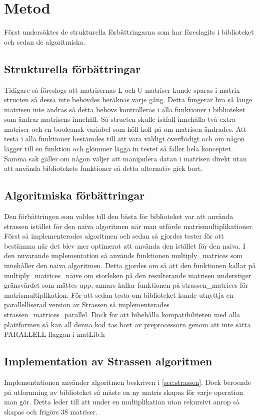 \section{Metod}
Först undersöktes de strukturella förbättringarna som har föreslagits i biblioteket och sedan de algoritmiska.
\subsection{Strukturella förbättringar}
Tidigare så föreslogs att matrisernas L och U matriser kunde sparas i matrix-structen så dessa inte behövdes beräknas varje gång. Detta fungerar bra så länge matrisen inte ändras så detta behövs kontrolleras i alla funktioner i biblioteket som ändrar matrisens innehåll. Så structen skulle isåfall innehålla två extra matriser och en booleansk variabel som höll koll på om matrisen ändrades. Att testa i alla funktioner bestämdes till att vara väldigt överflödigt och om någon lägger till en funktion och glömmer lägga in testet så faller hela konceptet. Samma sak gäller om någon väljer att manipulera datan i matrisen direkt utan att använda bibliotekets funktioner så detta alternativ gick bort.

\subsection{Algoritmiska förbättringar}
Den förbättringen som valdes till den bästa för biblioteket var att använda strassen istället för den naiva algoritmen när man utförde matrismultiplikationer. Först så implementerades algoritmen och sedan så gjordes tester för att bestämma när det blev mer optimerat att använda den istället för den naiva. I den nuvarande implementation så används funktionen multiply\_matrices som innehåller den naiva algoritmen. Detta gjordes om så att den funktionen kallar på multiply\_matrices\_naive om storleken på den resulterande matrisen understiger gränsvärdet som mättes upp, annars kallar funktionen på strassen\_matrices för matrismultiplikation. 
\newline
\newline
För att sedan testa om biblioteket kunde utnyttja en parallelliserad version av Strassen så implementerades  strassen\_matrices\_parallel. Dock för att bibehålla kompatibiliteten med alla plattformen så kan all denna kod tas bort av preprocessorn genom att inte sätta PARALLELL flaggan i matLib.h
\subsection{Implementation av Strassen algoritmen}
Implementationen använder algoritmen beskriven i \ref{sec:strassen}. Dock beroende på utformning av biblioteket så måste en ny matris skapas för varje operation man gör. Detta leder till att under en multiplikation utan rekursivt anrop så skapas och frigörs 38 matriser. 

